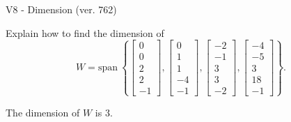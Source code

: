 \begin{exercise}
  \begin{exerciseTitle}V8 - Dimension (ver. 762)\end{exerciseTitle}
  \begin{exerciseStatement}
    Explain how to find the dimension of 
\[W=\mathrm{span}\ \left\{\left[\begin{array}{r}
0 \\
0 \\
2 \\
2 \\
-1
\end{array}\right] , \left[\begin{array}{r}
0 \\
1 \\
1 \\
-4 \\
-1
\end{array}\right] , \left[\begin{array}{r}
-2 \\
-1 \\
3 \\
3 \\
-2
\end{array}\right] , \left[\begin{array}{r}
-4 \\
-5 \\
3 \\
18 \\
-1
\end{array}\right]\right\}.\]



  \end{exerciseStatement}
  \begin{exerciseAnswer}
   The dimension of \(W\) is  \(3\).
  


  \end{exerciseAnswer}
\end{exercise}